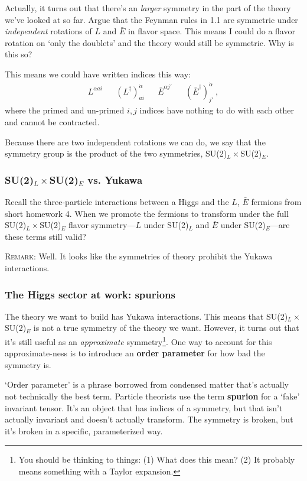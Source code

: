\documentclass[12pt]{article}
\begin{document}
Actually, it turns out that there's an \emph{larger} symmetry in the part of the theory we've looked at so far. Argue that the Feynman rules in 1.1 are symmetric under \emph{independent} rotations of $L$ and $\bar E$ in flavor space. This means I could do a flavor rotation on `only the doublets' and the theory would still be symmetric. Why is this so?

This means we could have written indices this way:
\begin{align}
	L^{\alpha a i} 
	&&
	(L^\dag)^{\dot\alpha}_{a i}
	&&
	\bar E^{\alpha j'} 
	&&
	(\bar E^\dag)^{\dot\alpha}_{j'} 
	\ ,
\end{align}
where the primed and un-primed $i,j$ indices have nothing to do with each other and cannot be contracted. 

Because there are two independent rotations we can do, we say that the symmetry group is the product of the two symmetries, SU(2)$_L\times$SU(2)$_E$.

\subsubsection{SU(2)$_L\times$SU(2)$_E$ vs. Yukawa}

Recall the three-particle interactions between a Higgs and the $L$, $\bar E$ fermions from short homework 4. When we promote the fermions to transform under the full SU(2)$_L\times$SU(2)$_E$ flavor symmetry---$L$ under SU(2)$_L$ and $\bar E$ under SU(2)$_E$---are these terms still valid?

\textsc{Remark:} Well. It looks like the symmetries of theory prohibit the Yukawa interactions. 

\subsubsection{The Higgs sector at work: spurions}

The theory we want to build has Yukawa interactions. This means that SU(2)$_L\times$SU(2)$_E$ is not a true symmetry of the theory we want. However, it turns out that it's still useful as an \emph{approximate} symmetry\footnote{You should be thinking to things: (1) What does this mean? (2) It probably means something with a Taylor expansion.}. One way to account for this approximate-ness is to introduce an \textbf{order parameter} for how bad the symmetry is. 

`Order parameter' is a phrase borrowed from condensed matter that's actually not technically the best term. Particle theorists use the term \textbf{spurion} for a `fake' invariant tensor. It's an object that has indices of a symmetry, but that isn't actually invariant and doesn't actually transform. The symmetry is broken, but it's broken in a specific, parameterized way. 
\end{document}
